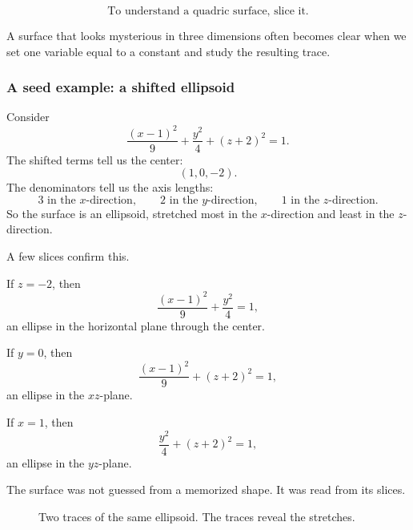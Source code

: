 \[
\boxed{
    \text{To understand a quadric surface, slice it.}
}
\]

A surface that looks mysterious in three dimensions often becomes clear when we set
one variable equal to a constant and study the resulting trace.

\subsubsection*{A seed example: a shifted ellipsoid}

Consider
\[
    \frac{(x-1)^2}{9}+\frac{y^2}{4}+(z+2)^2=1.
\]
The shifted terms tell us the center:
\[
    (1,0,-2).
\]
The denominators tell us the axis lengths:
\[
    3 \text{ in the }x\text{-direction},\qquad
    2 \text{ in the }y\text{-direction},\qquad
    1 \text{ in the }z\text{-direction}.
\]
So the surface is an ellipsoid, stretched most in the \(x\)-direction and least in the
\(z\)-direction.

A few slices confirm this.

If \(z=-2\), then
\[
    \frac{(x-1)^2}{9}+\frac{y^2}{4}=1,
\]
an ellipse in the horizontal plane through the center.

If \(y=0\), then
\[
    \frac{(x-1)^2}{9}+(z+2)^2=1,
\]
an ellipse in the \(xz\)-plane.

If \(x=1\), then
\[
    \frac{y^2}{4}+(z+2)^2=1,
\]
an ellipse in the \(yz\)-plane.

The surface was not guessed from a memorized shape.  It was read from its slices.

\begin{figure}[h]
\centering
{}
\caption{Two traces of the same ellipsoid.  The traces reveal the stretches.}
\end{figure}

